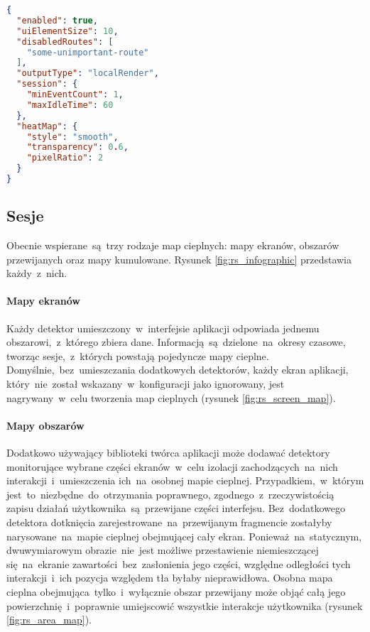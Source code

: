 \bigskip
\begin{lstlisting}[language=json,caption={Przykładowy plik konfiguracyjny~w~formacie {\it JSON}},label=lst:rs_config_json]
{
  "enabled": true,
  "uiElementSize": 10,
  "disabledRoutes": [
    "some-unimportant-route"
  ],
  "outputType": "localRender",
  "session": {
    "minEventCount": 1,
    "maxIdleTime": 60
  },
  "heatMap": {
    "style": "smooth",
    "transparency": 0.6,
    "pixelRatio": 2
  }
}
\end{lstlisting}

\subsection{Sesje}
Obecnie wspierane~są~trzy rodzaje map cieplnych: mapy ekranów, obszarów przewijanych oraz mapy kumulowane. Rysunek \ref{fig:rs_infographic} przedstawia każdy~z~nich.


\paragraph{Mapy ekranów} Każdy detektor umieszczony~w~interfejsie aplikacji odpowiada jednemu obszarowi,~z~którego zbiera dane. Informacją~są~dzielone~na~okresy czasowe, tworząc sesje,~z~których powstają pojedyncze mapy cieplne. Domyślnie,~bez~umieszczania dodatkowych detektorów, każdy ekran aplikacji, który~nie~został wskazany~w~konfiguracji jako ignorowany, jest nagrywany~w~celu tworzenia map cieplnych (rysunek \ref{fig:rs_screen_map}).


\paragraph{Mapy obszarów} Dodatkowo używający biblioteki twórca aplikacji może dodawać detektory monitorujące wybrane części ekranów~w~celu izolacji zachodzących~na~nich interakcji~i~umieszczenia ich~na~osobnej mapie cieplnej. Przypadkiem,~w~którym jest~to~niezbędne~do~otrzymania poprawnego, zgodnego~z~rzeczywistością zapisu działań użytkownika~są~przewijane części interfejsu. Bez~dodatkowego detektora dotknięcia zarejestrowane~na~przewijanym fragmencie zostałyby narysowane~na~mapie cieplnej obejmującej cały ekran. Ponieważ~na~statycznym, dwuwymiarowym obrazie~nie~jest możliwe przestawienie niemieszczącej się~na~ekranie zawartości~bez~zasłonienia jego części, względne odległości tych interakcji~i~ich pozycja względem tła byłaby nieprawidłowa. Osobna mapa cieplna obejmująca~tylko~i~wyłącznie obszar przewijany może objąć całą jego powierzchnię~i~poprawnie umiejscowić wszystkie interakcje użytkownika (rysunek \ref{fig:rs_area_map}).

